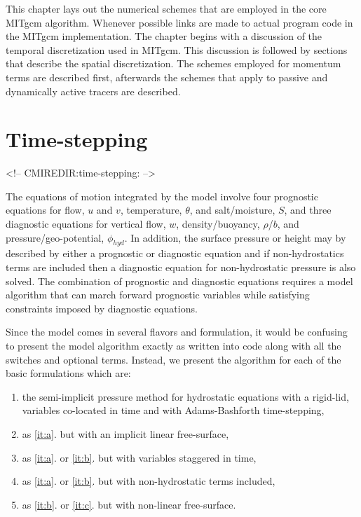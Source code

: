 
This chapter lays out the numerical schemes that are
employed in the core MITgcm algorithm. Whenever possible
links are made to actual program code in the MITgcm implementation.
The chapter begins with a discussion of the temporal discretization
used in MITgcm. This discussion is followed by sections that
describe the spatial discretization. The schemes employed for momentum
terms are described first, afterwards the schemes that apply to
passive and dynamically active tracers are described.



\section{Time-stepping}
\label{sec:time_stepping}
\begin{rawhtml}
<!-- CMIREDIR:time-stepping: -->
\end{rawhtml}

The equations of motion integrated by the model involve four
prognostic equations for flow, $u$ and $v$, temperature, $\theta$, and
salt/moisture, $S$, and three diagnostic equations for vertical flow,
$w$, density/buoyancy, $\rho$/$b$, and pressure/geo-potential,
$\phi_{hyd}$. In addition, the surface pressure or height may by
described by either a prognostic or diagnostic equation and if
non-hydrostatics terms are included then a diagnostic equation for
non-hydrostatic pressure is also solved. The combination of prognostic
and diagnostic equations requires a model algorithm that can march
forward prognostic variables while satisfying constraints imposed by
diagnostic equations.

Since the model comes in several flavors and formulation, it would be
confusing to present the model algorithm exactly as written into code
along with all the switches and optional terms. Instead, we present
the algorithm for each of the basic formulations which are:
\begin{enumerate}
\item the semi-implicit pressure method for hydrostatic equations
with a rigid-lid, variables co-located in time and with
Adams-Bashforth time-stepping, \label{it:a}
\item as \ref{it:a}. but with an implicit linear free-surface, \label{it:b}
\item as \ref{it:a}. or \ref{it:b}. but with variables staggered in time,
\label{it:c}
\item as \ref{it:a}. or \ref{it:b}. but with non-hydrostatic terms included,
\item as \ref{it:b}. or \ref{it:c}. but with non-linear free-surface.
\end{enumerate}

